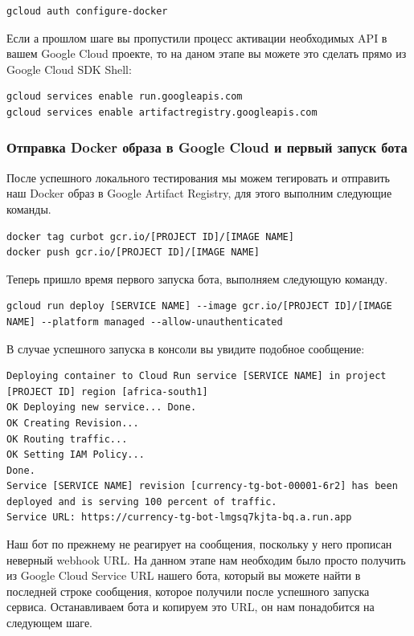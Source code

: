 \documentclass[
]{book}
\begin{document}
\begin{verbatim}
gcloud auth configure-docker
\end{verbatim}

Если а прошлом шаге вы пропустили процесс активации необходимых API в вашем Google Cloud проекте, то на даном этапе вы можете это сделать прямо из Google Cloud SDK Shell:

\begin{verbatim}
gcloud services enable run.googleapis.com
gcloud services enable artifactregistry.googleapis.com
\end{verbatim}

\subsubsection{Отправка Docker образа в Google Cloud и первый запуск бота}\label{ux43eux442ux43fux440ux430ux432ux43aux430-docker-ux43eux431ux440ux430ux437ux430-ux432-google-cloud-ux438-ux43fux435ux440ux432ux44bux439-ux437ux430ux43fux443ux441ux43a-ux431ux43eux442ux430}

После успешного локального тестирования мы можем тегировать и отправить наш Docker образ в Google Artifact Registry, для этого выполним следующие команды.

\begin{verbatim}
docker tag curbot gcr.io/[PROJECT ID]/[IMAGE NAME]
docker push gcr.io/[PROJECT ID]/[IMAGE NAME]
\end{verbatim}

Теперь пришло время первого запуска бота, выполняем следующую команду.

\begin{verbatim}
gcloud run deploy [SERVICE NAME] --image gcr.io/[PROJECT ID]/[IMAGE NAME] --platform managed --allow-unauthenticated
\end{verbatim}

В случае успешного запуска в консоли вы увидите подобное сообщение:

\begin{verbatim}
Deploying container to Cloud Run service [SERVICE NAME] in project [PROJECT ID] region [africa-south1]
OK Deploying new service... Done.
OK Creating Revision...
OK Routing traffic...
OK Setting IAM Policy...
Done.
Service [SERVICE NAME] revision [currency-tg-bot-00001-6r2] has been deployed and is serving 100 percent of traffic.
Service URL: https://currency-tg-bot-lmgsq7kjta-bq.a.run.app
\end{verbatim}

Наш бот по прежнему не реагирует на сообщения, поскольку у него прописан неверный webhook URL. На данном этапе нам необходим было просто получить из Google Cloud Service URL нашего бота, который вы можете найти в последней строке сообщения, которое получили после успешного запуска сервиса. Останавливаем бота и копируем это URL, он нам понадобится на следующем шаге.
\end{document}
